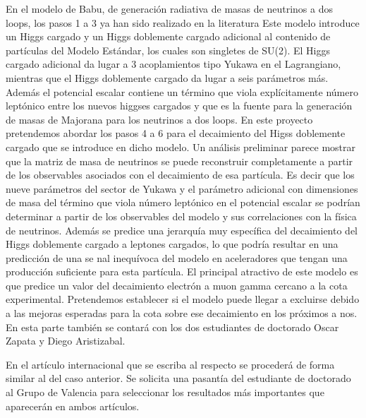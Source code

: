 En el modelo de Babu, de generación radiativa de masas de neutrinos a
dos loops, los pasos 1 a 3 ya han sido realizado en la literatura
Este modelo introduce un Higgs cargado y un Higgs
doblemente cargado adicional al contenido de partículas del
Modelo Estándar, los cuales son singletes de SU(2). El Higgs cargado
adicional da lugar a 3 acoplamientos tipo Yukawa en el Lagrangiano,
mientras que el Higgs doblemente cargado da lugar a seis parámetros
más.  Además el potencial escalar contiene un término que viola
explícitamente número leptónico entre los nuevos higgses cargados
y que es la fuente para la generación de masas de Majorana para los
neutrinos a dos loops.  En este proyecto pretendemos abordar los pasos
4 a 6 para el decaimiento del Higss doblemente cargado que se
introduce en dicho modelo. Un análisis preliminar parece mostrar que
la matriz de masa de neutrinos se puede reconstruir completamente a
partir de los observables asociados con el decaimiento de esa
partícula. Es decir que los nueve parámetros del sector de Yukawa
y el parámetro adicional con dimensiones de masa del término que viola
número leptónico en el potencial escalar se podrían determinar a
partir de los observables del modelo y sus correlaciones con la
física de neutrinos. Además se predice una jerarquía muy
específica del decaimiento del Higgs doblemente cargado a
leptones cargados, lo que podría resultar en una predicción de
una se nal inequívoca del modelo en aceleradores que tengan una
producción suficiente para esta partícula. El principal atractivo
de este modelo es que predice un valor del decaimiento electrón a muon
gamma cercano a la cota experimental. Pretendemos establecer si el
modelo puede llegar a excluirse debido a las mejoras esperadas para la
cota sobre ese decaimiento en los próximos a nos. En esta parte también
se contará con los dos estudiantes de doctorado Oscar Zapata y Diego
Aristizabal.

En el artículo internacional que se escriba al respecto se procederá
de forma similar al del caso anterior. Se solicita una pasantía del
estudiante de doctorado al Grupo de Valencia para seleccionar los
resultados más importantes que aparecerán en ambos artículos.


